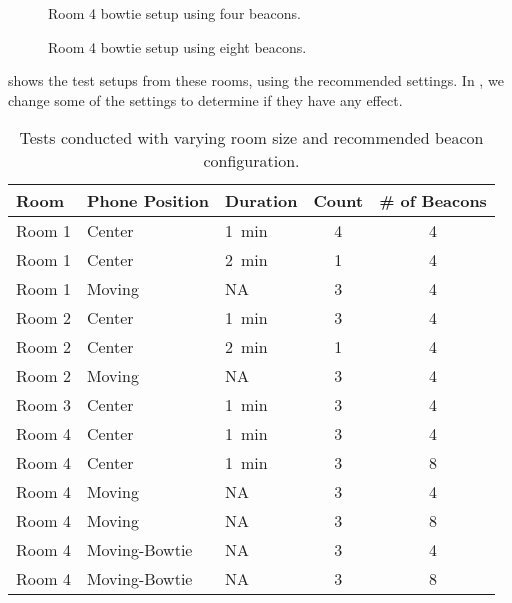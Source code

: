 \begin{figure}[!htb]
    \begin{minipage}[b]{0.45\textwidth}
      \centering
        
        \caption{Room 4 bowtie setup using four beacons.}
        \label{fig:bowtie4beacons}
    \end{minipage}
    \hfill
    \begin{minipage}[b]{0.45\textwidth}
      \centering
        
        \caption{Room 4 bowtie setup using eight beacons.}
        \label{fig:bowtie8beacons}
    \end{minipage}
\end{figure}

 shows the test setups from these rooms,
using the recommended settings.
In , we change some of the settings to determine if they have any effect.

\begin{table}[!htb]
    \centering
    \begin{tabular}{l| l l c c}
        Room   & Phone Position & Duration 	       & Count & \# of Beacons \\ \hline
        Room 1 & Center         & \SI{1}{\minute}  & 4  & 4 \\ 
        Room 1 & Center         & \SI{2}{\minute}  & 1     & 4 \\ 
        Room 1 & Moving         & NA               & 3     & 4 \\
        Room 2 & Center         & \SI{1}{\minute}  & 3     & 4 \\ 
        Room 2 & Center         & \SI{2}{\minute}  & 1     & 4 \\
        Room 2 & Moving         & NA               & 3     & 4 \\ 
        Room 3 & Center         & \SI{1}{\minute}  & 3     & 4 \\ 
        Room 4 & Center         & \SI{1}{\minute}  & 3     & 4 \\ 
        Room 4 & Center         & \SI{1}{\minute}  & 3     & 8 \\ 
        Room 4 & Moving         & NA       & 3     & 4 \\
        Room 4 & Moving         & NA       & 3     & 8 \\
        Room 4 & Moving-Bowtie  & NA       & 3     & 4 \\
        Room 4 & Moving-Bowtie  & NA       & 3     & 8 \\
    \end{tabular}
    \caption{Tests conducted with varying room size and recommended beacon configuration.}
    \label{table:precisiontest:roomsize}
\end{table}


